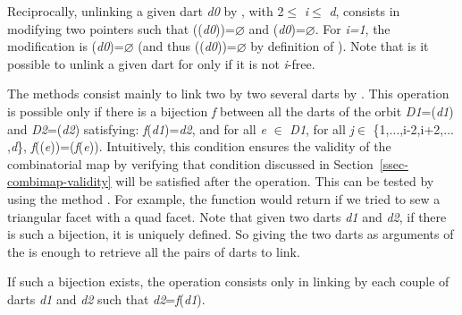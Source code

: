 Reciprocally, unlinking a given dart \emph{d0} by \betai{}, with 2$\leq$
\emph{i}$\leq$ \emph{d}, consists in modifying two \betai{} pointers
such that \betai{}(\betai{}(\emph{d0}))=$\varnothing$ and
\betai{}(\emph{d0})=$\varnothing$.  For \emph{i=1}, the modification is
\betaun{}(\emph{d0})=$\varnothing$ (and thus
\betazero{}(\betaun{}(\emph{d0}))=$\varnothing$ by definition of \betazero{}).  Note
that is it possible to unlink a given dart for \betai{} only if it is
not \emph{i}-free.

The  methods consist mainly to link two by two
several darts by \betai{}. This operation is possible only if there is
a bijection \emph{f} between all the darts of the orbit
\emph{D1}=\orbit{\betaun{},$\ldots$,\betaimdeux{},\betaipdeux{},$\ldots$,\betad{}}(\emph{d1}) and
\emph{D2}=\orbit{\betaun{},$\ldots$,\betaimdeux{},\betaipdeux{},$\ldots$,\betad{}}(\emph{d2})
satisfying: \emph{f}(\emph{d1})=\emph{d2}, and for all \emph{e} $\in$ \emph{D1}, for all \emph{j}$\in$
\{1,$\ldots$,i-2,i+2,$\ldots$,\emph{d}\},
\emph{f}(\betaj{}(\emph{e}))=\betajinv{}(\emph{f}(\emph{e})).  Intuitively, this condition
ensures the validity of the combinatorial map by verifying that
condition discussed in Section~\ref{ssec-combimap-validity} will be
satisfied after the operation.  This can be tested by using the method
. For example, the function
 would return  if we tried to sew a
triangular facet with a quad facet. Note that given two darts \emph{d1}
and \emph{d2}, if there is such a bijection, it is uniquely defined. So giving
the two darts as arguments of the  is enough to retrieve
all the pairs of darts to link.

If such a bijection exists, the  operation
consists only in linking by \betai{} each couple of darts \emph{d1} and
\emph{d2} such that \emph{d2}=\emph{f}(\emph{d1}).



